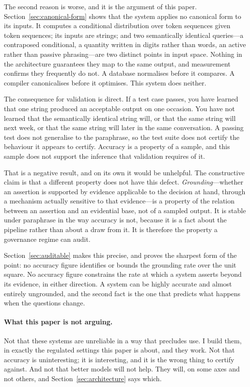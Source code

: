 The second reason is worse, and it is the argument of this paper.
Section~\ref{sec:canonical-form} shows that the system applies no canonical form
to its inputs. It computes a conditional distribution over token sequences given
token sequences; its inputs are strings; and two semantically identical
queries---a contraposed conditional, a quantity written in digits rather than
words, an active rather than passive phrasing---are two distinct points in input
space. Nothing in the architecture guarantees they map to the same output, and
measurement confirms they frequently do not. A database normalises before it
compares. A compiler canonicalises before it optimises. This system does
neither.

The consequence for validation is direct. If a test case passes, you have
learned that one string produced an acceptable output on one occasion. You have
not learned that the semantically identical string will, or that the same string
will next week, or that the same string will later in the same conversation. A
passing test does not generalise to the paraphrase, so the test suite does not
certify the behaviour it appears to certify. Accuracy is a property of a sample,
and this sample does not support the inference that validation requires of it.

That is a negative result, and on its own it would be unhelpful. The
constructive claim is that a different property does not have this defect.
\emph{Grounding}---whether an assertion is supported by evidence applicable to
the decision at hand, through a mechanism actually sensitive to that
evidence---is a property of the relation between an assertion and an evidential
base, not of a sampled output. It is stable under paraphrase in the way accuracy
is not, because it is a fact about the pipeline rather than about a draw from it.
It is therefore the property a governance regime can audit.

Section~\ref{sec:auditable} makes this precise, and proves the sharpest form of
the point: no accuracy figure identifies or bounds the grounding rate over the
unit square. No accuracy figure constrains the rate at which a system asserts
beyond its evidence, in either direction. A system can be highly accurate and
almost entirely ungrounded, and the second fact is the one that predicts what
happens when the questions change.

\paragraph{What this paper is not arguing.} Not that these systems are
unreliable in a way that precludes use. I build them, in exactly the regulated
settings this paper is about, and they work. Not that accuracy is uninteresting;
it is interesting, and it is the wrong thing to certify against. And not that
better models will not help. They will, on some axes and not others, and
Section~\ref{sec:architecture} says which.

